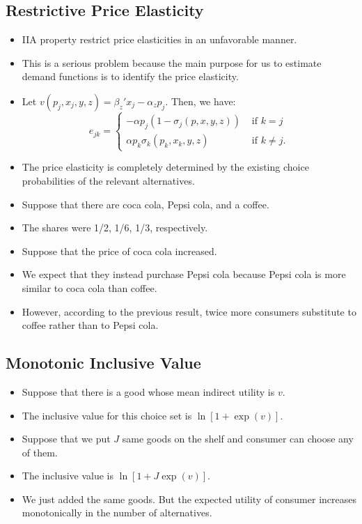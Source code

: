 \documentclass[
]{book}
\providecommand{\tightlist}{%
  \setlength{\itemsep}{0pt}\setlength{\parskip}{0pt}}
\begin{document}
\hypertarget{restrictive-price-elasticity}{%
\subsection{Restrictive Price Elasticity}\label{restrictive-price-elasticity}}

\begin{itemize}
\tightlist
\item
  IIA property restrict price elasticities in an unfavorable manner.
\item
  This is a serious problem because the main purpose for us to estimate demand functions is to identify the price elasticity.
\item
  Let \(v(p_j, x_j, y, z) = \beta_z'x_j - \alpha_z p_j\). Then, we have:
  \begin{equation}
  e_{jk} =
  \begin{cases}
  -\alpha p_{j} (1 - \sigma_j(p, x, y, z)) &\text{   if   } k = j\\
  \alpha p_{k} \sigma_k(p_k, x_k, y, z) &\text{   if   } k \neq j.
  \end{cases}
  \end{equation}
\item
  The price elasticity is completely determined by the existing choice probabilities of the relevant alternatives.
\item
  Suppose that there are coca cola, Pepsi cola, and a coffee.
\item
  The shares were 1/2, 1/6, 1/3, respectively.
\item
  Suppose that the price of coca cola increased.
\item
  We expect that they instead purchase Pepsi cola because Pepsi cola is more similar to coca cola than coffee.
\item
  However, according to the previous result, twice more consumers substitute to coffee rather than to Pepsi cola.
\end{itemize}

\hypertarget{monotonic-inclusive-value}{%
\subsection{Monotonic Inclusive Value}\label{monotonic-inclusive-value}}

\begin{itemize}
\tightlist
\item
  Suppose that there is a good whose mean indirect utility is \(v\).
\item
  The inclusive value for this choice set is \(\ln[1 + \exp(v)]\).
\item
  Suppose that we put \(J\) same goods on the shelf and consumer can choose any of them.
\item
  The inclusive value is \(\ln[1 + J \exp(v)]\).
\item
  We just added the same goods. But the expected utility of consumer increases monotonically in the number of alternatives.
\end{itemize}
\end{document}
